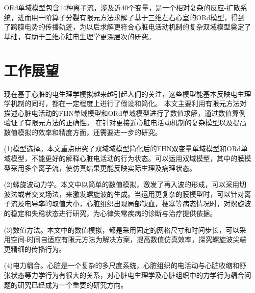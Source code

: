 \documentclass[twoside,UTF8]{nputhesis}
\begin{document}
ORd单域模型包含14种离子流，涉及近40个变量，是一个相对复杂的反应-扩散系统，进而用一阶算子分裂有限元方法求解了基于三维左右心室的ORd模型，得到了跨膜电势的传播轨迹，为以后求解更符合心脏电活动机制的复杂双域模型奠定了基础，有助于三维心脏电生理学更深层次的研究。
\section{工作展望}
现在基于心脏的电生理学模拟越来越引起人们的关注，这些模型能基本反映电生理学机制的同时，都在一定程度上进行了假设和简化。
本文主要利用有限元方法对描述心脏电活动的FHN单域模型和ORd单域模型进行了数值求解，通过数值算例验证了有限元方法的正确性。
在针对更接近心脏电活动机制的复杂模型以及提高数值模拟的效率和精度方面，还需要进一步的研究。

(1)模型选择。本文重点研究了双域域模型简化后的FHN双变量单域模型和ORd单域模型，不能更好的解释心脏电活动的行为状态。可以运用双域模型，其中的膜模型采用多个离子流，使仿真结果更能反映实际生理及病理状态。

(2)螺旋波动力学。本文中以简单的数值模拟，激发了再入波的形成，可以采用切波法或者交叉场法，来激发螺旋波的生成。当运用更复杂的膜模型时，可以针对离子流及电导率的取值大小，心脏组织出现局部缺血，梗塞等病态情况时，对螺旋波的稳定和失稳状态进行研究，为心律失常疾病的诊断与治疗提供依据。

(3)数值方法。本文中的数值模拟，都是采用固定的网格尺寸和时间步长，可以采用空间-时间自适应有限元方法为解决方案，提高数值仿真效率，探究螺旋波尖端更精细的传播行为。

(4)电力耦合。心脏是一个复杂的多尺度系统，心脏组织的电活动与心脏收缩和舒张状态等力学行为有很大的关系，对心脏电生理学及心脏组织中的力学行为耦合问题的研究已经成为一个重要的研究方向。
\end{document}
